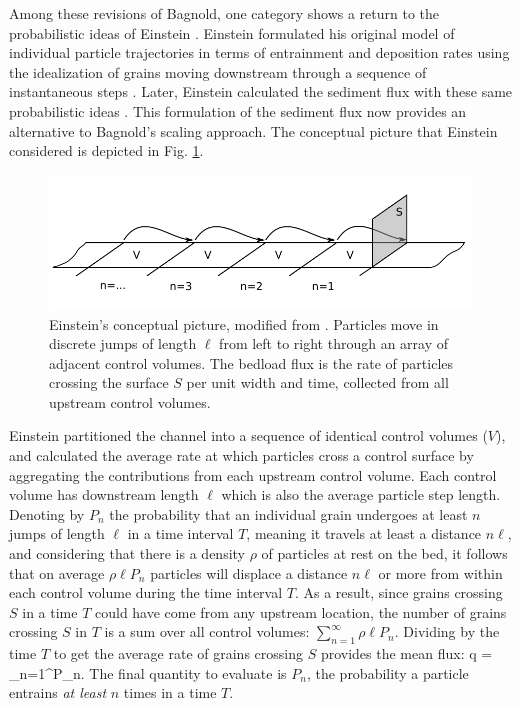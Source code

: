 Among these revisions of Bagnold, one category shows a return to the probabilistic ideas of Einstein \citep{Parker2003,Ancey2006}. Einstein formulated his original model of individual particle trajectories in terms of entrainment and deposition rates using the idealization of grains moving downstream through a sequence of instantaneous steps \citep{Einstein1937}.
Later, Einstein calculated the sediment flux with these same probabilistic ideas \citep{Einstein1942, Einstein1950}. This formulation of the sediment flux now provides an alternative to Bagnold's scaling approach.
The conceptual picture that Einstein considered is depicted in Fig. \ref{fig:einsteinFluxConcept}.
 \begin{figure}[!htbp]
	\includegraphics[width=\linewidth,keepaspectratio]{./figures/ch1/yalinDrawing.pdf}
	\caption{Einstein’s conceptual picture, modified from \citet{Yalin1972}. Particles move in discrete jumps of length $\ell$ from
left to right through an array of adjacent control volumes. The bedload flux is the rate of particles crossing
the surface $S$ per unit width and time, collected from all upstream control volumes.}
	\label{fig:einsteinFluxConcept}
\end{figure}

Einstein partitioned the channel into a sequence of identical control volumes ($V$), and calculated the average rate at which particles cross a control surface by aggregating the contributions from each upstream control volume.
Each control volume has downstream length $\ell$ which is also the average particle step length.
Denoting by $P_n$ the probability that an individual grain undergoes at least $n$ jumps of length $\ell$ in a time interval $T$, meaning it travels at least a distance $n \ell$, and considering that there is a density $\rho$ of particles at rest on the bed, it follows that on average $\rho \ell P_n$ particles will displace a distance $n \ell$ or more from within each control volume during the time interval $T$. 
As a result, since grains crossing $S$ in a time $T$ could have come from any upstream location, the number of grains crossing $S$ in $T$ is a sum over all control volumes: $\sum_{n=1}^\infty \rho \ell P_n$.
Dividing by the time $T$ to get the average rate of grains crossing $S$ provides the mean flux:
\be q =  \sum_{n=1}^\infty P_n. \label{eq:einflux} \ee
The final quantity to evaluate is $P_n$, the probability a particle entrains \textit{at least} $n$ times in a time $T$.


